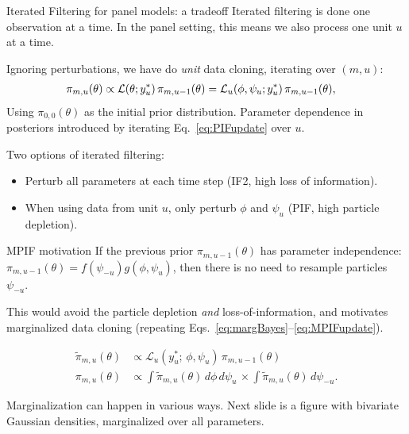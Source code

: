\documentclass[aspectratio=169]{beamer}\usepackage[]{graphicx}\usepackage[]{xcolor}
\begin{document}
\begin{frame}{Iterated Filtering for panel models: a tradeoff}
  Iterated filtering is done one observation at a time. 
  In the panel setting, this means we also process one unit $u$ at a time.
  
  Ignoring perturbations, we have do \emph{unit} data cloning, iterating over $(m, u)$: 
  \begin{align}
    \pi_{m, u}(\theta) &\propto \mathcal{L}(\theta; y_u^*)\, \pi_{m, u-1}(\theta) = \mathcal{L}_u(\phi, \psi_u; y_u^*)\, \pi_{m, u-1}(\theta), \label{eq:PIFupdate}
  \end{align}
    Using $\pi_{0, 0}(\theta)$ as the initial prior distribution. Parameter dependence in posteriors introduced by iterating Eq.~\ref{eq:PIFupdate} over $u$.
    
    Two options of iterated filtering: 
    \begin{itemize}
      \item Perturb all parameters at each time step (IF2, high loss of information). 
      \item When using data from unit $u$, only perturb $\phi$ and $\psi_u$ (PIF, high particle depletion). 
    \end{itemize}
\end{frame}

\begin{frame}{MPIF motivation}
  If the previous prior $\pi_{m, u-1}(\theta)$ has parameter independence: $\pi_{m, u-1}(\theta) = f(\psi_{-u})g(\phi, \psi_{u})$, then there is no need to resample particles $\psi_{-u}$. 
  
  This would avoid the particle depletion \emph{and} loss-of-information, and motivates marginalized data cloning (repeating Eqs.~\ref{eq:margBayes}--\ref{eq:MPIFupdate}).
  
  \begin{align}
\tilde{\pi}_{m, u}(\theta) &\propto \mathcal{L}_{u}(y^*_u;\, \phi, \psi_u)\, \pi_{m, u-1}(\theta) \label{eq:margBayes}\\
\pi_{m, u}(\theta) &\propto \int \! \tilde{\pi}_{m, u}(\theta) \, d\phi \, d\psi_u \, \times \int \! \tilde{\pi}_{m, u}(\theta) \, d\psi_{-u} \label{eq:MPIFupdate}.
\end{align}\pause

Marginalization can happen in various ways. Next slide is a figure with bivariate Gaussian densities, marginalized over all parameters. 

\end{frame}
\end{document}
